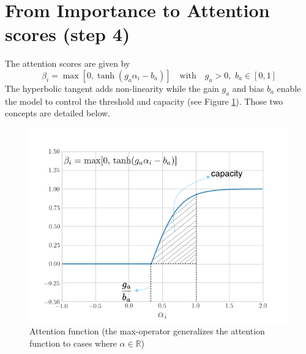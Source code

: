 
\section{From Importance to Attention scores (step 4)}\label{sec:capacity}
The attention scores are given by
\begin{equation}
\beta_i = \max[0, \tanh(g_a\alpha_i - b_a)] \quad \text{with} \quad g_a > 0,\,\,b_a\in [0,1]
\end{equation}
The hyperbolic tangent adds non-linearity while the gain $g_a$ and bias $b_a$ enable the model to control the threshold and capacity (see Figure \ref{fig:attention-function}). Those two concepts are detailed below.
\begin{figure}[!h]
\centering
\includegraphics[scale=0.5]{figures/tanh-annotated}
\caption[Attention function]{Attention function (the max-operator generalizes the attention function to cases where $\alpha \in \mathbb{R}$)}
\label{fig:attention-function}
\end{figure}

